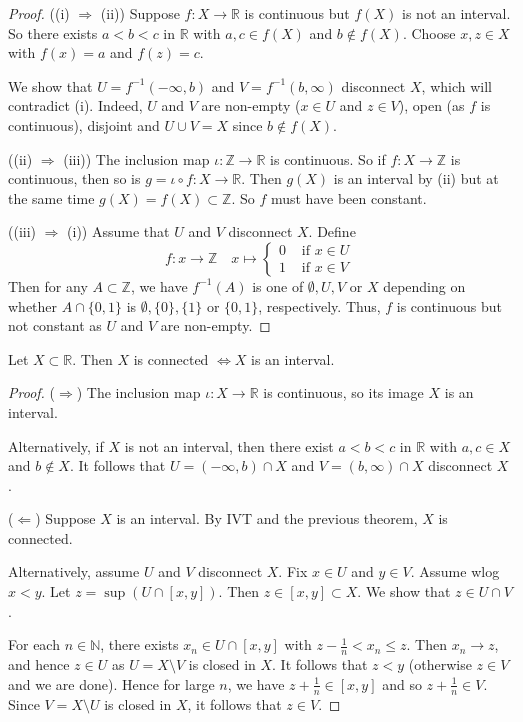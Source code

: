 \documentclass[a4paper,11pt]{article}
\begin{document}
\begin{proof}
    ((i) $ \Rightarrow$ (ii)) Suppose $f: X \rightarrow \mathbb{R}$ is continuous but $f(X)$ is not an interval. So there exists $a<b<c$ in $\mathbb{R}$ with $a, c \in f(X)$ and $b \notin f(X)$. Choose $x, z \in X$ with $f(x)=a$ and $f(z)=c$. 
    
    We show that $U=f^{-1}(-\infty, b)$ and $V=f^{-1}(b, \infty)$ disconnect $X$, which will contradict (i). Indeed, $U$ and $V$ are non-empty ($x \in U$ and $z \in V$), open (as $f$ is continuous), disjoint and $U \cup V=X$ since $b \notin f(X)$.

    ((ii) $\Rightarrow$ (iii)) The inclusion map $\iota: \mathbb{Z} \rightarrow \mathbb{R}$ is continuous. So if $f: X \rightarrow \mathbb{Z}$ is continuous, then so is $g=\iota \circ f: X \rightarrow \mathbb{R}$. Then $g(X)$ is an interval by (ii) but at the same time $g(X)=f(X) \subset \mathbb{Z}$. So $f$ must have been constant.
 
    ((iii) $\Rightarrow$ (i)) Assume that $U$ and $V$ disconnect $X$. Define
    $$
    f: x \rightarrow \mathbb{Z} \quad x \mapsto \begin{cases}0 & \text { if } x \in U \\ 1 & \text { if } x \in V\end{cases}
    $$
    Then for any $A \subset \mathbb{Z}$, we have $f^{-1}(A)$ is one of $\emptyset, U, V$ or $X$ depending on whether $A \cap\{0,1\}$ is $\emptyset,\{0\},\{1\}$ or $\{0,1\}$, respectively. Thus, $f$ is continuous but not constant as $U$ and $V$ are non-empty.
\end{proof}

\begin{corollary}
    Let $X \subset \mathbb{R}$. Then $X$ is connected $\Longleftrightarrow X$ is an interval.
\end{corollary}
\begin{proof}
    ($ \Rightarrow $) The inclusion map $\iota: X \rightarrow \mathbb{R}$ is continuous, so its image $X$ is an interval. 
    
    Alternatively, if $X$ is not an interval, then there exist $a<b<c$ in $\mathbb{R}$ with $a, c \in X$ and $b \notin X$. It follows that $U=(-\infty, b) \cap X$ and $V=(b, \infty) \cap X$ disconnect $X$.

    ($ \Leftarrow $) Suppose $X$ is an interval. By IVT and the previous theorem, $X$ is connected. 
    
    Alternatively, assume $U$ and $V$ disconnect $X$. Fix $x \in U$ and $y \in V$. Assume wlog $x<y$. Let $z=\sup (U \cap[x, y])$. Then $z \in[x, y] \subset X$. We show that $z \in U \cap V$. 
    
    For each $n \in \mathbb{N}$, there exists $x_{n} \in U \cap[x, y]$ with $z-\frac{1}{n}<x_{n} \leqslant z$. Then $x_{n} \rightarrow z$, and hence $z \in U$ as $U=X \setminus V$ is closed in $X$. It follows that $z<y$ (otherwise $z \in V$ and we are done). Hence for large $n$, we have $z+\frac{1}{n} \in[x, y]$ and so $z+\frac{1}{n} \in V$. Since $V=X \setminus U$ is closed in $X$, it follows that $z \in V$.
\end{proof}
\end{document}
